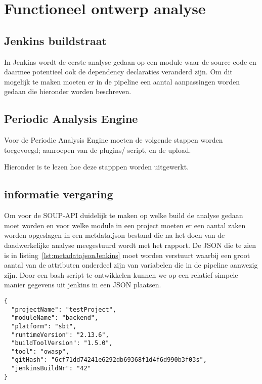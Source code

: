 \chapter{Functioneel ontwerp analyse}\label{ch:impl-Jenkins}


\section{Jenkins buildstraat}\label{sec:jenkins-buildtstraat}
In Jenkins wordt de eerste analyse gedaan op een module waar de source code en daarmee potentieel ook de dependency declaraties veranderd zijn.
Om dit mogelijk te maken moeten er in de pipeline een aantal aanpassingen worden gedaan die hieronder worden beschreven.

\section{Periodic Analysis Engine}\label{sec:pae-builstraat}
Voor de Periodic Analysis Engine moeten de volgende stappen worden toegevoegd; aanroepen van de plugins/ script, en de upload.

Hieronder is te lezen hoe deze stapppen worden uitgewerkt.

\section{informatie vergaring}\label{sec:informatie-vergaring}
Om voor de SOUP-API duidelijk te maken op welke build de analyse gedaan moet worden en voor welke module in een project moeten er een aantal zaken worden opgeslagen in een metdata.json bestand die na het doen van de daadwerkelijke analyse meegestuurd wordt met het rapport. De JSON die te zien is in listing~\ref{lst:metadatajsonJenkins} moet worden verstuurt waarbij een groot aantal van de attributen onderdeel zijn van variabelen die in de pipeline aanwezig zijn.
Door een bash script te ontwikkelen kunnen we op een relatief simpele manier gegevens uit jenkins in een JSON plaatsen.

\begin{lstlisting}[caption={metadata JSON object behorende bij de case class}, label={lst:metadatajsonJenkins}]
{
  "projectName": "testProject",
  "moduleName": "backend",
  "platform": "sbt",
  "runtimeVersion": "2.13.6",
  "buildToolVersion": "1.5.0",
  "tool": "owasp",
  "gitHash": "6cf71dd74241e6292db69368f1d4f6d990b3f03s",
  "jenkinsBuildNr": "42"
}
\end{lstlisting}

